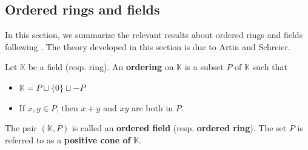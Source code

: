 \documentclass{amsart}
\begin{document}


\subsection{Ordered rings and fields}
\label{subsec:OrderedRingAndFields}
In this section, we summarize the relevant results about ordered rings and fields following \cite[Chapter XI]{LangAlgebra}. The theory developed in this section is due to Artin and Schreier.

\begin{defi}
    Let $\mathbb{K}$ be a field (resp. ring). An \textbf{ordering} on $\mathbb{K}$ is a subset $P$ of $\mathbb{K}$ such that
    \begin{itemize}
        \item[(ORD 1)]\label{item:ORD1} $\mathbb{K} = P\sqcup \{0\} \sqcup -P$
        \item[(ORD 2)]\label{item:ORD2} If $x,y\in P$, then $x+y$ and $xy$ are both in $P$.
    \end{itemize}
The pair $(\mathbb{K},P)$ is called an \textbf{ordered field} (resp. \textbf{ordered ring}). The set $P$ is referred to as a \textbf{positive cone of } $\mathbb{K}$. 
\end{defi}
\end{document}
